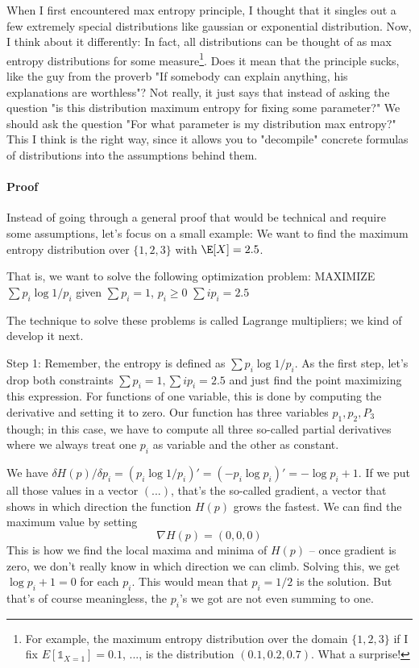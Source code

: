 \documentclass{article}
\begin{document}
When I first encountered max entropy principle, I thought that it singles out a few extremely special distributions like gaussian or exponential distribution. 
Now, I think about it differently: In fact, all distributions can be thought of as max entropy distributions for some measure\footnote{For example, the maximum entropy distribution over the domain $\{1,2,3\}$ if I fix $E[\mathbb{1}_{X = 1}] = 0.1$, ..., is the distribution $(0.1, 0.2, 0.7)$. What a surprise! }. Does it mean that the principle sucks, like the guy from the proverb "If somebody can explain anything, his explanations are worthless"? Not really, it just says that instead of asking the question "is this distribution maximum entropy for fixing some parameter?" We should ask the question "For what parameter is my distribution max entropy?" This I think is the right way, since it allows you to "decompile" concrete formulas of distributions into the assumptions behind them. 

\paragraph{Proof}

Instead of going through a general proof that would be technical and require some assumptions, let's focus on a small example: 
We want to find the maximum entropy distribution over $\{1,2,3\}$ with $\E[X] = 2.5$. 

That is, we want to solve the following optimization problem:
MAXIMIZE $\sum p_i \log 1/p_i$
given $\sum p_i = 1$, $p_i \ge 0$
$\sum i p_i = 2.5$

The technique to solve these problems is called Lagrange multipliers; we kind of develop it next. 

Step 1:
Remember, the entropy is defined as $\sum p_i \log 1/p_i$. As the first step, let's drop both constraints $\sum p_i = 1, \sum ip_i = 2.5$ and just find the point maximizing this expression. 
For functions of one variable, this is done by computing the derivative and setting it to zero. Our function has three variables $p_1,p_2,P_3$ though; in this case, we have to compute all three so-called partial derivatives where we always treat one $p_i$ as variable and the other as constant. 

We have $\delta H(p) / \delta p_i = (p_i \log 1/p_i)' = (-p_i \log p_i)' = -\log p_i + 1$. If we put all those values in a vector $(...)$, that's the so-called gradient, a vector that shows in which direction the function $H(p)$ grows the fastest. 
We can find the maximum value by setting 
\[
\nabla H(p) = (0,0,0)
\]
This is how we find the local maxima and minima of $H(p)$ -- once gradient is zero, we don't really know in which direction we can climb.
Solving this, we get $\log p_i + 1 = 0$ for each $p_i$. This would mean that $p_i = 1/2$ is the solution. But that's of course meaningless, the $p_i$'s we got are not even summing to one. 
\end{document}
